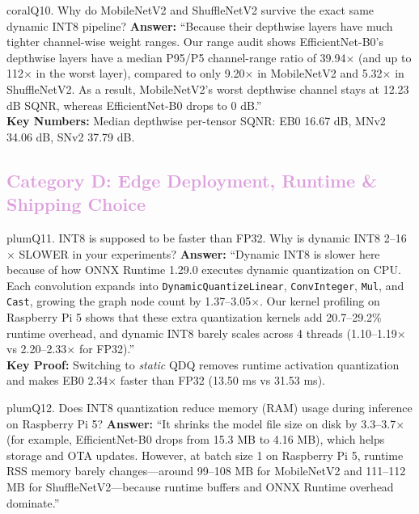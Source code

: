 \documentclass[10pt,a4paper]{article}
\begin{document}
\begin{qabox}{coral}{Q10. Why do MobileNetV2 and ShuffleNetV2 survive the exact same dynamic INT8 pipeline?}
\textbf{Answer:}
``Because their depthwise layers have much tighter channel-wise weight ranges. Our range audit shows EfficientNet-B0's depthwise layers have a median P95/P5 channel-range ratio of 39.94$\times$ (and up to 112$\times$ in the worst layer), compared to only 9.20$\times$ in MobileNetV2 and 5.32$\times$ in ShuffleNetV2. As a result, MobileNetV2's worst depthwise channel stays at 12.23 dB SQNR, whereas EfficientNet-B0 drops to 0 dB.''\\[3pt]
\textbf{Key Numbers:} Median depthwise per-tensor SQNR: EB0 16.67 dB, MNv2 34.06 dB, SNv2 37.79 dB.
\end{qabox}

\subsection*{\textcolor{plum}{Category D: Edge Deployment, Runtime \& Shipping Choice}}

\begin{qabox}{plum}{Q11. INT8 is supposed to be faster than FP32. Why is dynamic INT8 2--16$\times$ SLOWER in your experiments?}
\textbf{Answer:}
``Dynamic INT8 is slower here because of how ONNX Runtime 1.29.0 executes dynamic quantization on CPU. Each convolution expands into \texttt{DynamicQuantizeLinear}, \texttt{ConvInteger}, \texttt{Mul}, and \texttt{Cast}, growing the graph node count by 1.37--3.05$\times$. Our kernel profiling on Raspberry Pi 5 shows that these extra quantization kernels add 20.7--29.2\% runtime overhead, and dynamic INT8 barely scales across 4 threads (1.10--1.19$\times$ vs 2.20--2.33$\times$ for FP32).''\\[3pt]
\textbf{Key Proof:} Switching to \emph{static} QDQ removes runtime activation quantization and makes EB0 2.34$\times$ faster than FP32 (13.50 ms vs 31.53 ms).
\end{qabox}

\begin{qabox}{plum}{Q12. Does INT8 quantization reduce memory (RAM) usage during inference on Raspberry Pi 5?}
\textbf{Answer:}
``It shrinks the model file size on disk by 3.3--3.7$\times$ (for example, EfficientNet-B0 drops from 15.3 MB to 4.16 MB), which helps storage and OTA updates. However, at batch size 1 on Raspberry Pi 5, runtime RSS memory barely changes---around 99--108 MB for MobileNetV2 and 111--112 MB for ShuffleNetV2---because runtime buffers and ONNX Runtime overhead dominate.''
\end{qabox}
\end{document}
